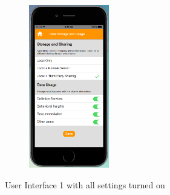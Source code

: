 \begin{figure}
\begin{subfigure}[t]{0.24\textwidth}
	\end{subfigure}%
	~
	\begin{subfigure}[t]{0.24\textwidth}
		\centering
		\includegraphics[height=2.8in]{figures/ui1allOn4.png}
	\end{subfigure}%
	\caption{User Interface 1 with all settings turned on}
	\label{fig:ui1AllOn}
\end{figure}

